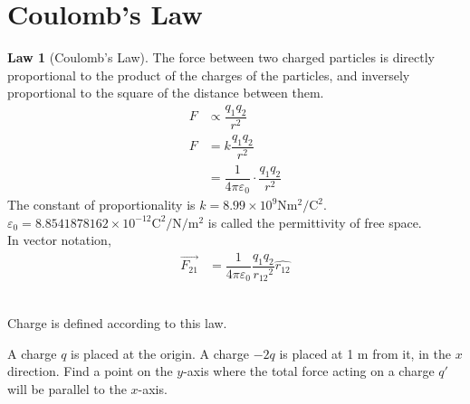\documentclass[fleqn, a4paper, 12pt, twoside]{article}
\theoremstyle{definition}
\theoremstyle{theorem}
\newtheorem{law}{Law}
\begin{document}
\section{Coulomb's Law}

\begin{law}[Coulomb's Law]
	The force between two charged particles is directly proportional to the product of the charges of the particles, and inversely proportional to the square of the distance between them.
	\begin{align*}
		F &\propto \dfrac{q_1 q_2}{r^2}\\
		F &= k \dfrac{q_1 q_2}{r^2}\\
		&= \dfrac{1}{4 \pi \varepsilon_0} \cdot \dfrac{q_1 q_2}{r^2}
	\end{align*}
	The constant of proportionality is $k = 8.99 \times 10^9 \si{\newton\metre\squared\per\coulomb\squared}$.\\
	$\varepsilon_0 = 8.8541878162 \times 10^{-12} \si{\coulomb\squared\per\newton\per\metre\squared}$ is called the permittivity of free space.\\
	In vector notation,
	\begin{align*}
		\overrightarrow{F_{2 1}} &= \dfrac{1}{4 \pi \varepsilon_0} \dfrac{q_1 q_2}{{r_{1 2}}^2} \hat{r_{1 2}}
	\end{align*}
	\label{Coulomb's_Law}
\end{law}
~\\
Charge is defined according to this law.\\

\begin{question}
	A charge $q$ is placed at the origin. A charge $-2q$ is placed at 1 \si{\metre} from it, in the $x$ direction. Find a point on the $y$-axis where the total force acting on a charge $q'$ will be parallel to the $x$-axis.\\
\end{question}
\end{document}
